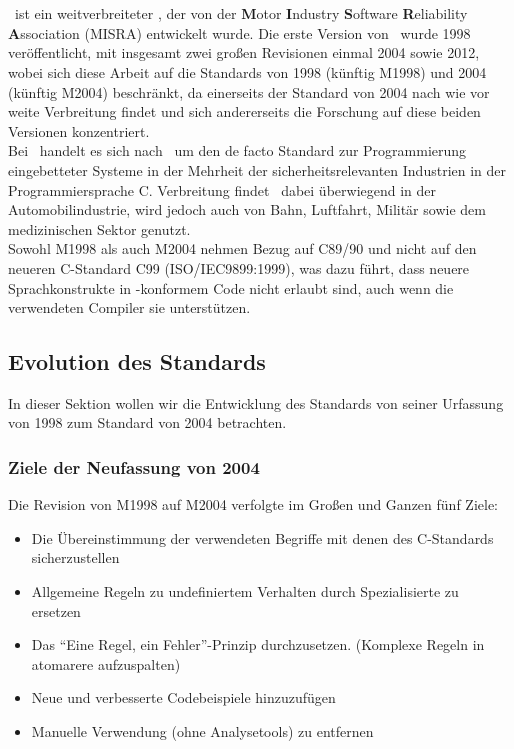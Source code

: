 \documentclass[a4paper,UKenglish,cleveref, autoref]{templates/lipics-v2019}
\begin{document}
    \section{\misra}
    \label{sec:misra-c}
    \misra\ ist ein weitverbreiteter \sqs,
    der von der \textbf{M}otor \textbf{I}ndustry \textbf{S}oftware \textbf{R}eliability \textbf{A}ssociation (MISRA) entwickelt wurde.
    Die erste Version von \misra\ wurde 1998 veröffentlicht, mit insgesamt zwei großen Revisionen einmal 2004 sowie 2012,
    wobei sich diese Arbeit auf die Standards von 1998 (künftig M1998) und 2004 (künftig M2004) beschränkt,
    da einerseits der Standard von 2004 nach wie vor weite Verbreitung findet und sich andererseits die Forschung
    auf diese beiden Versionen konzentriert.\\
    Bei \misra\ handelt es sich nach~\cite{misra-website} um den de facto Standard zur Programmierung eingebetteter Systeme
    in der Mehrheit der sicherheitsrelevanten Industrien in der Programmiersprache C\@.
    Verbreitung findet \misra\ dabei überwiegend in der Automobilindustrie, wird jedoch auch von Bahn, Luftfahrt, Militär
    sowie dem medizinischen Sektor genutzt.\\
    Sowohl M1998 als auch M2004 nehmen Bezug auf C89/90 und nicht auf den neueren C-Standard C99 (ISO/IEC9899:1999),
    was dazu führt, dass neuere Sprachkonstrukte in \misra-konformem Code nicht erlaubt sind,
    auch wenn die verwendeten Compiler sie unterstützen.

    \subsection{Evolution des Standards}
    \label{subsec:evolution-des-standards}

    In dieser Sektion wollen wir die Entwicklung des Standards von seiner Urfassung von 1998 zum Standard von 2004
    betrachten.

    \subsubsection{Ziele der Neufassung von 2004}
    Die Revision von M1998 auf M2004 verfolgte im Großen und Ganzen fünf Ziele:

    \begin{itemize}
        \item Die Übereinstimmung der verwendeten Begriffe mit denen des C-Standards sicherzustellen
        \item Allgemeine Regeln zu undefiniertem Verhalten durch Spezialisierte zu ersetzen
        \item Das \enquote{Eine Regel, ein Fehler}-Prinzip durchzusetzen.
            (Komplexe Regeln in atomarere aufzuspalten)
        \item Neue und verbesserte Codebeispiele hinzuzufügen
        \item Manuelle Verwendung (ohne Analysetools) zu entfernen
    \end{itemize}
\end{document}
